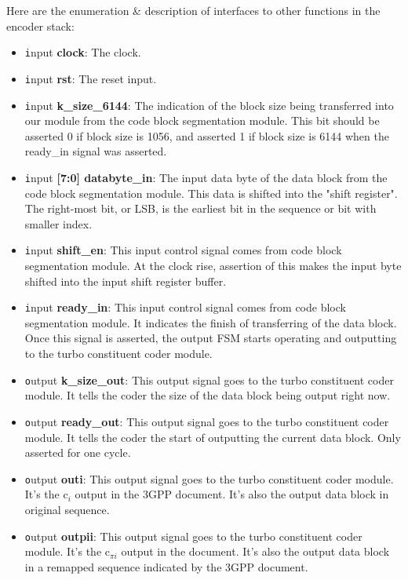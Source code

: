 \documentclass[letterpaper, 12pt]{article} %
\begin{document}
Here are the enumeration \& description of interfaces to other functions in the encoder stack:
\begin{itemize}
    \item {\texttt input} {\bf clock}: The clock.
    \item {\texttt input} {\bf rst}: The reset input.
    \item {\texttt input} {\bf k\_size\_6144}: The indication of the block size being transferred into our module from the code block segmentation module. This bit should be asserted 0 if block size is 1056, and asserted 1 if block size is 6144 when the ready\_in signal was asserted.
    \item {\texttt input} {\bf [7:0] databyte\_in}: The input data byte of the data block from the code block segmentation module. This data is shifted into the "shift register". The right-most bit, or LSB, is the earliest bit in the sequence or bit with smaller index.
    \item {\texttt input} {\bf shift\_en}: This input control signal comes from code block segmentation module. At the clock rise, assertion of this makes the input byte shifted into the input shift register buffer.
    \item {\texttt input} {\bf ready\_in}: This input control signal comes from code block segmentation module. It indicates the finish of transferring of the data block. Once this signal is asserted, the output FSM starts operating and outputting to the turbo constituent coder module.
    \item {\texttt output} {\bf k\_size\_out}: This output signal goes to the turbo constituent coder module. It tells the coder the size of the data block being output right now.
    \item {\texttt output} {\bf ready\_out}: This output signal goes to the turbo constituent coder module. It tells the coder the start of outputting the current data block. Only asserted for one cycle. 
    \item {\texttt output} {\bf outi}: This output signal goes to the turbo constituent coder module. It's the c$_i$ output in the 3GPP document. It's also the output data block in original sequence.
    \item {\texttt output} {\bf outpii}: This output signal goes to the turbo constituent coder module. It's the c$_{\pi i}$ output in the document. It's also the output data block in a remapped sequence indicated by the 3GPP document.
\end{itemize}
\end{document}
